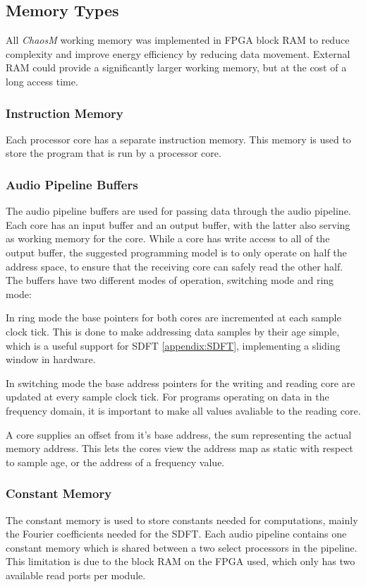 
\subsection{Memory Types}\label{subsec:fpga-memory}

All \textit{ChaosM} working memory was implemented in FPGA block RAM to reduce complexity
and improve energy efficiency by reducing data movement. External RAM could
provide a significantly larger working memory, but at the cost of a long access time.

\subsubsection{Instruction Memory}
Each processor core has a separate instruction memory. This memory is used to
store the program that is run by a processor core.

\subsubsection{Audio Pipeline Buffers}
The audio pipeline buffers are used for passing data through the audio pipeline.
Each core has an input buffer and an output buffer, with the latter also serving
as working memory for the core. While a core has write access to all of the
output buffer, the suggested programming model is to only operate on half the
address space, to ensure that the receiving core can safely read the other half.
The buffers have two different modes of operation, switching mode and ring mode:

In ring mode the base pointers for both cores are incremented at each sample
clock tick. This is done to make addressing data samples by their age simple,
which is a useful support for SDFT \ref{appendix:SDFT}, implementing a sliding
window in hardware.

In switching mode the base address pointers for the writing and reading core are
updated at every sample clock tick. For programs operating on data in the
frequency domain, it is important to make all values avaliable to the reading core.

A core supplies an offset from it's base address, the sum representing the
actual memory address. This lets the cores view the address map as static with
respect to sample age, or the address of a frequency value.


\subsubsection{Constant Memory}
The constant memory is used to store constants needed for computations, mainly
the Fourier coefficients needed for the SDFT. Each audio pipeline contains one
constant memory which is shared between a two select processors in the
pipeline. This limitation is due to the block RAM on the FPGA used, which only
has two available read ports per module.

